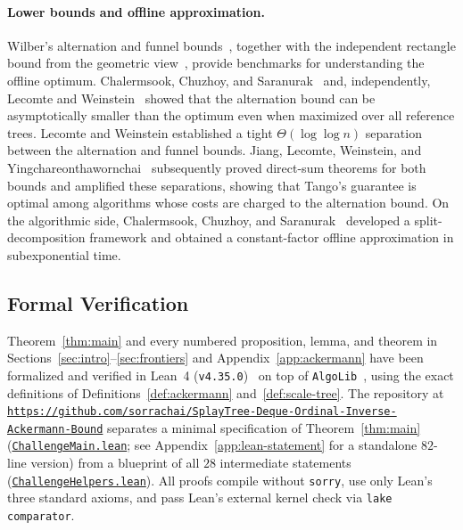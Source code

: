 \documentclass[11pt]{article}
\theoremstyle{definition}
\theoremstyle{remark}
\begin{document}
\paragraph{Lower bounds and offline approximation.}
Wilber's alternation and funnel
bounds~\cite{wilber1989lower}, together with the independent
rectangle bound from the geometric
view~\cite{DemaineHarmonIaconoKanePatrascu2009}, provide benchmarks for
understanding the offline optimum.
Chalermsook, Chuzhoy, and Saranurak~\cite{ChalermsookCS20}
and, independently, Lecomte and
Weinstein~\cite{lecomte2020settling} showed that the
alternation bound can be asymptotically smaller than the
optimum even when maximized over all reference trees.
Lecomte and Weinstein established a tight
$\Theta(\log\log n)$ separation between the alternation
and funnel bounds.
Jiang, Lecomte, Weinstein, and
Yingchareonthawornchai~\cite{jiang2024hardness}
subsequently proved direct-sum theorems for both bounds
and amplified these separations, showing that Tango's
guarantee is optimal among algorithms whose costs are
charged to the alternation bound.
On the algorithmic side, Chalermsook, Chuzhoy, and
Saranurak~\cite{ChalermsookCS20} developed a split-decomposition
framework and obtained a constant-factor offline approximation
in subexponential time.


\subsection{Formal Verification}
\label{subsec:formal-verification}
Theorem~\ref{thm:main} and every numbered proposition, lemma, and theorem in Sections~\ref{sec:intro}--\ref{sec:frontiers} and Appendix~\ref{app:ackermann} have been formalized and verified in Lean~4 (\texttt{v4.35.0})~\cite{MouraUllrich2021} on top of \texttt{AlgoLib}~\cite{AlgoLib2026}, using the exact definitions of Definitions~\ref{def:ackermann} and~\ref{def:scale-tree}. The repository at \href{https://github.com/sorrachai/SplayTree-Deque-Ordinal-Inverse-Ackermann-Bound}{\texttt{https://github.com/\allowbreak sorrachai/\allowbreak SplayTree-\allowbreak Deque-\allowbreak Ordinal-\allowbreak Inverse-\allowbreak Ackermann-\allowbreak Bound}} separates a minimal specification of Theorem~\ref{thm:main} (\href{https://github.com/sorrachai/SplayTree-Deque-Ordinal-Inverse-Ackermann-Bound/blob/main/ChallengeMain.lean}{\texttt{ChallengeMain.lean}}; see Appendix~\ref{app:lean-statement} for a standalone $82$-line version) from a blueprint of all $28$ intermediate statements (\href{https://github.com/sorrachai/SplayTree-Deque-Ordinal-Inverse-Ackermann-Bound/blob/main/ChallengeHelpers.lean}{\texttt{ChallengeHelpers.lean}}). All proofs compile without \texttt{sorry}, use only Lean's three standard axioms, and pass Lean's external kernel check via \texttt{lake comparator}.
\end{document}
